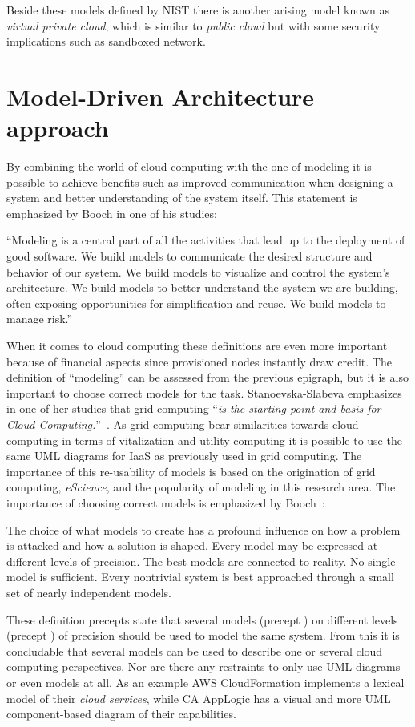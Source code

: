 Beside these models defined by NIST there is another arising model known as 
\emph{virtual private cloud}, which is similar to \emph{public cloud} 
but with some security implications such as sandboxed network.

\section{Model-Driven Architecture approach}

By combining the world of cloud computing with the one of modeling 
it is possible to achieve benefits such as improved communication when designing 
a system and better understanding of the system itself.
This statement is emphasized by Booch \etal in one of his studies:
\epigraph{
  ``Modeling is a central
  part of all the activities that lead up to the deployment of good
  software. We build models to communicate the desired structure and
  behavior of our system. We build models to visualize and control the
  system's architecture. We build models to better understand the
  system we are building, often exposing opportunities for
  simplification and reuse. We build models to manage risk.''
}{}
When it comes to cloud computing these definitions are even more important
because of financial aspects since provisioned nodes instantly draw credit.
The definition of ``modeling'' can be assessed from the previous epigraph, but it is 
also important to choose correct models for the task.
Stanoevska-Slabeva emphasizes in one of her studies that grid computing
``\emph{is the starting point and basis for Cloud Computing.}''~\cite{introduction:wozniak10}.
As grid computing bear similarities towards cloud computing in terms of vitalization and utility computing
it is possible to use the same UML diagrams for IaaS as previously used in grid computing.
The importance of this re-usability of models is based on the origination of grid computing, \emph{eScience},
and the popularity of modeling in this research area.
The importance of choosing correct models is emphasized by Booch~\cite{unified:booch05}:
\epigraph{
  \begin{ii}\iitem The choice
  of what models to create has a profound influence on how a problem
  is attacked and how a solution is shaped. \iitem Every model may be
  expressed at different levels of precision. \iitem The best models
  are connected to reality. \iitem No single model is
  sufficient. Every nontrivial system is best approached through a
  small set of nearly independent models.\end{ii}
}{}
These definition precepts state that several models (precept ) on different levels (precept ) 
of precision should be used to model the same system.
From this it is concludable that several models can be used to describe one or several cloud computing perspectives.
Nor are there any restraints to only use UML diagrams or even models at all.
As an example AWS CloudFormation implements a lexical model of their \emph{cloud services},
while CA AppLogic has a visual and more UML component-based diagram of their capabilities.

